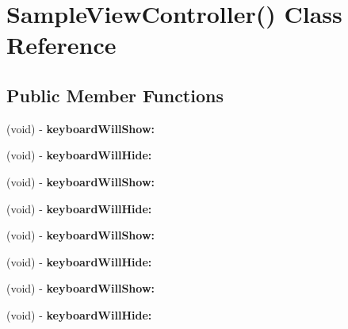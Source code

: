 \hypertarget{interface_sample_view_controller_07_08}{
\section{\-Sample\-View\-Controller() \-Class \-Reference}
\label{interface_sample_view_controller_07_08}
}
\subsection*{\-Public \-Member \-Functions}
\begin{DoxyCompactItemize}
\item 
\hypertarget{interface_sample_view_controller_07_08_ae89f8d11e6c6ae804a362872a09b3909}{
(void) -\/ {\bfseries keyboard\-Will\-Show\-:}}
\label{interface_sample_view_controller_07_08_ae89f8d11e6c6ae804a362872a09b3909}

\item 
\hypertarget{interface_sample_view_controller_07_08_a41d82b154bd833df89751fd5844c1f28}{
(void) -\/ {\bfseries keyboard\-Will\-Hide\-:}}
\label{interface_sample_view_controller_07_08_a41d82b154bd833df89751fd5844c1f28}

\item 
\hypertarget{interface_sample_view_controller_07_08_ae89f8d11e6c6ae804a362872a09b3909}{
(void) -\/ {\bfseries keyboard\-Will\-Show\-:}}
\label{interface_sample_view_controller_07_08_ae89f8d11e6c6ae804a362872a09b3909}

\item 
\hypertarget{interface_sample_view_controller_07_08_a41d82b154bd833df89751fd5844c1f28}{
(void) -\/ {\bfseries keyboard\-Will\-Hide\-:}}
\label{interface_sample_view_controller_07_08_a41d82b154bd833df89751fd5844c1f28}

\item 
\hypertarget{interface_sample_view_controller_07_08_ae89f8d11e6c6ae804a362872a09b3909}{
(void) -\/ {\bfseries keyboard\-Will\-Show\-:}}
\label{interface_sample_view_controller_07_08_ae89f8d11e6c6ae804a362872a09b3909}

\item 
\hypertarget{interface_sample_view_controller_07_08_a41d82b154bd833df89751fd5844c1f28}{
(void) -\/ {\bfseries keyboard\-Will\-Hide\-:}}
\label{interface_sample_view_controller_07_08_a41d82b154bd833df89751fd5844c1f28}

\item 
\hypertarget{interface_sample_view_controller_07_08_ae89f8d11e6c6ae804a362872a09b3909}{
(void) -\/ {\bfseries keyboard\-Will\-Show\-:}}
\label{interface_sample_view_controller_07_08_ae89f8d11e6c6ae804a362872a09b3909}

\item 
\hypertarget{interface_sample_view_controller_07_08_a41d82b154bd833df89751fd5844c1f28}{
(void) -\/ {\bfseries keyboard\-Will\-Hide\-:}}
\label{interface_sample_view_controller_07_08_a41d82b154bd833df89751fd5844c1f28}

\end{DoxyCompactItemize}



